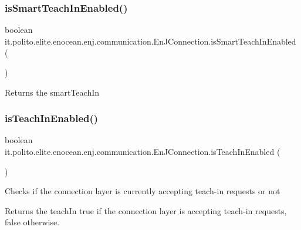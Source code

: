 \subsubsection{\texorpdfstring{is\+Smart\+Teach\+In\+Enabled()}{isSmartTeachInEnabled()}}
{\footnotesize\ttfamily boolean it.\+polito.\+elite.\+enocean.\+enj.\+communication.\+En\+J\+Connection.\+is\+Smart\+Teach\+In\+Enabled (\begin{DoxyParamCaption}{ }\end{DoxyParamCaption})}

\begin{DoxyReturn}{Returns}
the smart\+Teach\+In 
\end{DoxyReturn}
\hypertarget{classit_1_1polito_1_1elite_1_1enocean_1_1enj_1_1communication_1_1_en_j_connection_a479da123130eaeba3b2acb0d1081f1d6}{}\label{classit_1_1polito_1_1elite_1_1enocean_1_1enj_1_1communication_1_1_en_j_connection_a479da123130eaeba3b2acb0d1081f1d6} 
\subsubsection{\texorpdfstring{is\+Teach\+In\+Enabled()}{isTeachInEnabled()}}
{\footnotesize\ttfamily boolean it.\+polito.\+elite.\+enocean.\+enj.\+communication.\+En\+J\+Connection.\+is\+Teach\+In\+Enabled (\begin{DoxyParamCaption}{ }\end{DoxyParamCaption})}

Checks if the connection layer is currently accepting teach-\/in requests or not

\begin{DoxyReturn}{Returns}
the teach\+In true if the connection layer is accepting teach-\/in requests, false otherwise. 
\end{DoxyReturn}
\hypertarget{classit_1_1polito_1_1elite_1_1enocean_1_1enj_1_1communication_1_1_en_j_connection_afdd6f3068dab1cd68d0e4b6d3ad980cf}{}\label{classit_1_1polito_1_1elite_1_1enocean_1_1enj_1_1communication_1_1_en_j_connection_afdd6f3068dab1cd68d0e4b6d3ad980cf} 
